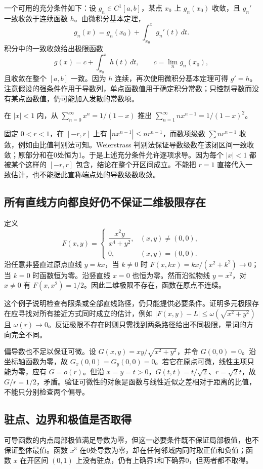 \documentclass[UTF8,12pt,a4paper,fontset=fandol]{ctexart}
\begin{document}
一个可用的充分条件如下：设 $g_n\in C^1[a,b]$，某点 $x_0$ 上 $g_n(x_0)$ 收敛，且 $g_n'$ 一致收敛于连续函数 $h$。由微积分基本定理，
\[
 g_n(x)=g_n(x_0)+\int_{x_0}^xg_n'(t)\,dt.
\]
积分中的一致收敛给出极限函数
\[
 g(x)=c+\int_{x_0}^xh(t)\,dt,
 \qquad c=\lim_ng_n(x_0),
\]
且收敛在整个 $[a,b]$ 一致。因为 $h$ 连续，再次使用微积分基本定理可得 $g'=h$。注意假设的强条件作用于导数列，单点函数值用于确定积分常数；只控制导数而没有某点函数值，仍可能加入发散的常数项。

\begin{example}
在 $|x|<1$ 内，从 $\sum_{n=0}^\infty x^n=1/(1-x)$ 推出 $\sum_{n=1}^\infty nx^{n-1}=1/(1-x)^2$。
\end{example}
\begin{solve}
固定 $0<r<1$，在 $[-r,r]$ 上有 $|nx^{n-1}|\leq nr^{n-1}$，而数项级数 $\sum nr^{n-1}$ 收敛，例如由比值判别法可知。Weierstrass 判别法保证导数级数在该闭区间一致收敛；原部分和在0处恒为1。于是上述充分条件允许逐项求导。因为每个 $|x|<1$ 都被某个这样的 $[-r,r]$ 包含，结论在整个开区间成立。不能把 $r=1$ 直接代入一致估计，也不能据此宣称端点处的导数级数收敛。
\end{solve}

\subsection{所有直线方向都良好仍不保证二维极限存在}
定义
\[
 F(x,y)=\begin{cases}\dfrac{x^2y}{x^4+y^2},&(x,y)\ne(0,0),\\0,&(x,y)=(0,0).\end{cases}
\]
沿任意非竖直过原点直线 $y=kx$，当 $k\ne0$ 时 $F(x,kx)=kx/(x^2+k^2)\to0$；当 $k=0$ 时函数恒为零。沿竖直线 $x=0$ 也恒为零。然而沿抛物线 $y=x^2$，对 $x\ne0$ 有 $F(x,x^2)=1/2$。因此二维极限不存在，函数在原点不连续。

这个例子说明检查有限条或全部直线路径，仍只能提供必要条件。证明多元极限存在应寻找对所有接近方式同时成立的估计，例如 $|F(x,y)-L|\leq\omega(\sqrt{x^2+y^2})$ 且 $\omega(r)\to0$。反证极限不存在时则只需找到两条路径给出不同极限，量词的方向完全不同。

偏导数也不足以保证可微。设 $G(x,y)=xy/\sqrt{x^2+y^2}$，并令 $G(0,0)=0$。沿坐标轴函数为零，故 $G_x(0,0)=G_y(0,0)=0$。若它在原点可微，线性主项只能为零，应有 $G=o(r)$。但沿 $x=y=t>0$，$G(t,t)=t/\sqrt2$、$r=\sqrt2t$，故 $G/r=1/2$，矛盾。验证可微性的对象是函数与线性近似之差相对于距离的比值，不能只分别检查两个偏导。

\subsection{驻点、边界和极值是否取得}
可导函数的内点局部极值满足导数为零，但这一必要条件既不保证局部极值，也不保证整体最值。函数 $x^3$ 在0处导数为零，却在任何邻域内同时取正值和负值；函数 $x$ 在开区间 $(0,1)$ 上没有驻点，仍有上确界1和下确界0，但两者都不取得。
\end{document}
